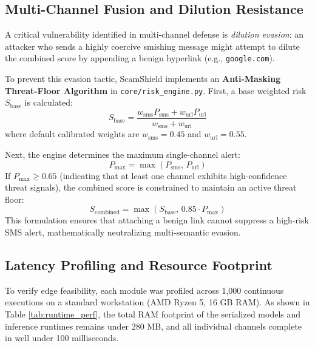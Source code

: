 \documentclass[conference]{IEEEtran}
\begin{document}
\subsection{Multi-Channel Fusion and Dilution Resistance}
A critical vulnerability identified in multi-channel defense is \textit{dilution evasion}: an attacker who sends a highly coercive smishing message might attempt to dilute the combined score by appending a benign hyperlink (e.g., \texttt{google.com}).

To prevent this evasion tactic, ScamShield implements an \textbf{Anti-Masking Threat-Floor Algorithm} in \texttt{core/risk\_engine.py}. First, a base weighted risk $S_{\text{base}}$ is calculated:
\begin{equation}
S_{\text{base}} = \frac{w_{\text{sms}} P_{\text{sms}} + w_{\text{url}} P_{\text{url}}}{w_{\text{sms}} + w_{\text{url}}}
\label{eq:weighted_avg}
\end{equation}
where default calibrated weights are $w_{\text{sms}} = 0.45$ and $w_{\text{url}} = 0.55$. 

Next, the engine determines the maximum single-channel alert:
\begin{equation}
P_{\text{max}} = \max\left(P_{\text{sms}},\, P_{\text{url}}\right)
\label{eq:pmax}
\end{equation}
If $P_{\text{max}} \ge 0.65$ (indicating that at least one channel exhibits high-confidence threat signals), the combined score is constrained to maintain an active threat floor:
\begin{equation}
S_{\text{combined}} = \max\left(S_{\text{base}},\, 0.85 \cdot P_{\text{max}}\right)
\label{eq:antimasking}
\end{equation}
This formulation ensures that attaching a benign link cannot suppress a high-risk SMS alert, mathematically neutralizing multi-semantic evasion.

\subsection{Latency Profiling and Resource Footprint}
To verify edge feasibility, each module was profiled across 1,000 continuous executions on a standard workstation (AMD Ryzen 5, 16 GB RAM). As shown in Table \ref{tab:runtime_perf}, the total RAM footprint of the serialized models and inference runtimes remains under 280 MB, and all individual channels complete in well under 100 milliseconds.
\end{document}
